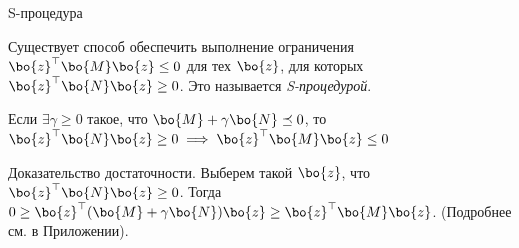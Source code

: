 \documentclass{beamer}
\begin{document}
\begin{frame}{S-процедура}
	\begin{flushleft}
		
		Существует способ обеспечить выполнение ограничения $\bo{z}^\top \bo{M}\bo{z} \leq 0$ для тех $\bo{z}$, для которых $\bo{z}^\top \bo{N}\bo{z} \geq 0$. Это называется \emph{S-процедурой}.
		
		\begin{theorem}[S-процедура]
			Если $\exists \gamma \geq 0$ такое, что $\bo{M} + \gamma \bo{N} \preceq 0$, то $\bo{z}^\top \bo{N}\bo{z} \geq 0 \implies \bo{z}^\top \bo{M}\bo{z} \leq 0$ 
		\end{theorem}
		
		\bigskip
		
		Доказательство достаточности. Выберем такой $\bo{z}$, что $\bo{z}^\top \bo{N}\bo{z} \geq 0$. Тогда $0 \geq \bo{z}^\top (\bo{M} + \gamma \bo{N}) \bo{z} \geq \bo{z}^\top \bo{M}\bo{z}$. \textcolor{mygray}{(Подробнее см. в Приложении)}.
		
		
	\end{flushleft}
\end{frame}
\end{document}
